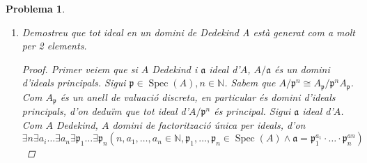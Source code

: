 \documentclass{article}
\DeclareMathOperator{\Quot}{Quot}
\DeclareMathOperator{\Spec}{Spec}
\DeclareMathOperator{\IdFrac}{IdFrac}
\newtheorem{problema}{Problema}
\begin{document}
\begin{problema}
\begin{enumerate}
\begin{proof}
\begin{align*}
                &\implies\exists\alpha\exists\gamma(\alpha,\gamma\in A-\{0\}\land\beta\alpha J=\gamma A)\\
                &\implies\beta J=\tfrac{\gamma}{\alpha}A\in\{\alpha A:\alpha\in\Quot(A)\}
            \end{align*}
            Per tant, $\ker{\varphi}\subset\{\alpha A:\alpha\in\Quot(A)\}$. Sigui $\alpha A\in\{\alpha A:\alpha\in\Quot(A)\}$. Clarament $\alpha A\sim A$. Aleshores, $\{\alpha A:\alpha\in\Quot(A)\}\subset\ker{\varphi}$. Per doble inclusió, $\ker{\varphi}=\{\alpha A:\alpha\in\Quot(A)\}$. Fixem-nos que amb aquesta caracterització es dedueix $\IdFrac(A)/\ker{\varphi}=\IdFrac(A)/\equiv$.\newline
            Veiem l'exhaustivitat de $\varphi$. Sigui $I\neq(0)$ ideal d'$A$ i $\beta\in A-\{0\}$. Tenim que $\tfrac{1}{\beta}I\in\IdFrac(A)$, ja que $\tfrac{1}{\beta}I$ és $A$-mòdul i $\beta(\tfrac{1}{\beta}I)=I\subset A$. A més, $\varphi(\tfrac{1}{\beta}I)=[\beta(\tfrac{1}{\beta}I)]=[I]$, d'on resulta l'exhaustivitat.\newline
            Ara, pel primer teorema d'isomorfisme obtenim $\IdFrac(A)/\ker{\varphi}\cong C\ell(A)$.
        \end{proof}
        \item Demostreu que tot ideal en un domini de Dedekind A està generat com a molt per 2 elements.
        \begin{proof}
            Primer veiem que si $A$ Dedekind i $\mathfrak{a}$ ideal d'$A$, $A/\mathfrak{a}$ és un domini d'ideals principals.\newline
            Sigui $\mathfrak{p}\in\Spec(A),n\in\mathbb{N}$. Sabem que $A/\mathfrak{p}^{n}\cong A_{\mathfrak{p}}/\mathfrak{p}^{n}A_{\mathfrak{p}}$. Com $A_{\mathfrak{p}}$ és un anell de valuació discreta, en particular és domini d'ideals principals, d'on deduïm que tot ideal d'$A/\mathfrak{p}^{n}$ és principal.\newline
            Sigui $\mathfrak{a}$ ideal d'$A$. Com $A$ Dedekind, $A$ domini de factorització única per ideals, d'on
            \begin{equation*}
                \exists n\exists a_{i}\ldots\exists a_{n}\exists\mathfrak{p}_{1}\ldots\exists\mathfrak{p}_{n}(n,a_{1},\ldots,a_{n}\in\mathbb{N},\mathfrak{p}_{1},\ldots,\mathfrak{p}_{n}\in\Spec(A)\land\mathfrak{a}=\mathfrak{p}_{1}^{a_{1}}\cdot\ldots\cdot\mathfrak{p}_{n}^{a{n}})
            \end{equation*}

\end{proof}
\end{enumerate}
\end{problema}
\end{document}
